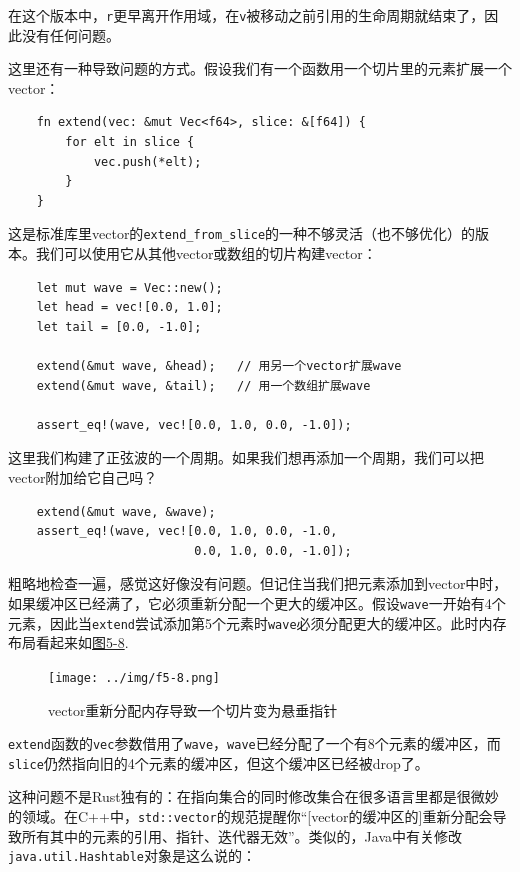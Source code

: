 在这个版本中，\texttt{r}更早离开作用域，在\texttt{v}被移动之前引用的生命周期就结束了，因此没有任何问题。

这里还有一种导致问题的方式。假设我们有一个函数用一个切片里的元素扩展一个vector：
\begin{verbatim}
    fn extend(vec: &mut Vec<f64>, slice: &[f64]) {
        for elt in slice {
            vec.push(*elt);
        }
    }
\end{verbatim}

这是标准库里vector的\texttt{extend\_from\_slice}的一种不够灵活（也不够优化）的版本。我们可以使用它从其他vector或数组的切片构建vector：
\begin{verbatim}
    let mut wave = Vec::new();
    let head = vec![0.0, 1.0];
    let tail = [0.0, -1.0];

    extend(&mut wave, &head);   // 用另一个vector扩展wave
    extend(&mut wave, &tail);   // 用一个数组扩展wave

    assert_eq!(wave, vec![0.0, 1.0, 0.0, -1.0]);
\end{verbatim}

这里我们构建了正弦波的一个周期。如果我们想再添加一个周期，我们可以把vector附加给它自己吗？
\begin{verbatim}
    extend(&mut wave, &wave);
    assert_eq!(wave, vec![0.0, 1.0, 0.0, -1.0,
                          0.0, 1.0, 0.0, -1.0]);
\end{verbatim}

粗略地检查一遍，感觉这好像没有问题。但记住当我们把元素添加到vector中时，如果缓冲区已经满了，它必须重新分配一个更大的缓冲区。假设\texttt{wave}一开始有4个元素，因此当\texttt{extend}尝试添加第5个元素时\texttt{wave}必须分配更大的缓冲区。此时内存布局看起来如\hyperref[f5-8]{图5-8}.

\begin{figure}[htbp]
    \centering
    \texttt{[image: ../img/f5-8.png]}
    \caption{vector重新分配内存导致一个切片变为悬垂指针}
    \label{f5-8}
\end{figure}

\texttt{extend}函数的\texttt{vec}参数借用了\texttt{wave}，\texttt{wave}已经分配了一个有8个元素的缓冲区，而\texttt{slice}仍然指向旧的4个元素的缓冲区，但这个缓冲区已经被drop了。

这种问题不是Rust独有的：在指向集合的同时修改集合在很多语言里都是很微妙的领域。在C++中，\texttt{std::vector}的规范提醒你“[vector的缓冲区的]重新分配会导致所有其中的元素的引用、指针、迭代器无效”。类似的，Java中有关修改\texttt{java.util.Hashtable}对象是这么说的：

